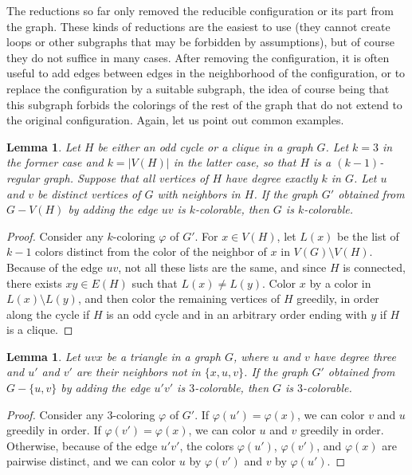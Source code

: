 \documentclass[12pt,twoside,openright,a4paper]{book}
\newtheorem{lemma}[theorem]{Lemma}
\begin{document}
The reductions so far only removed the reducible configuration or its part from the graph.  These kinds of reductions are the easiest
to use (they cannot create loops or other subgraphs that may be forbidden by assumptions), but of course they do not suffice in many cases.
After removing the configuration, it is often useful to add edges between edges in the neighborhood of the configuration, or to replace the
configuration by a suitable subgraph, the idea of course being that this subgraph forbids the colorings of the rest of the graph that do not
extend to the original configuration.  Again, let us point out common examples.
\begin{lemma}\label{lemma-oddclredu}
Let $H$ be either an odd cycle or a clique in a graph $G$.  Let $k=3$ in the former case and $k=|V(H)|$ in the latter case, so that $H$ is a $(k-1)$-regular graph.
Suppose that all vertices of $H$ have degree exactly $k$ in $G$.  Let $u$ and $v$ be distinct vertices of $G$ with neighbors in $H$.
If the graph $G'$ obtained from $G-V(H)$ by adding the edge $uv$ is $k$-colorable, then $G$ is $k$-colorable.
\end{lemma}
\begin{proof}
Consider any $k$-coloring $\varphi$ of $G'$.  For $x\in V(H)$, let $L(x)$ be the list of $k-1$ colors distinct from the color of the neighbor of $x$ in $V(G)\setminus V(H)$.
Because of the edge $uv$, not all these lists are the same, and since $H$ is connected, there exists $xy\in E(H)$ such that $L(x)\neq L(y)$.
Color $x$ by a color in $L(x)\setminus L(y)$, and then color the remaining vertices of $H$ greedily, in order along the cycle if $H$ is an odd cycle
and in an arbitrary order ending with $y$ if $H$ is a clique.
\end{proof}

\begin{lemma}\label{lemma-trian33}
Let $uvx$ be a triangle in a graph $G$, where $u$ and $v$ have degree three and $u'$ and $v'$ are their neighbors not in $\{x,u,v\}$.
If the graph $G'$ obtained from $G-\{u,v\}$ by adding the edge $u'v'$ is $3$-colorable, then $G$ is $3$-colorable.
\end{lemma}
\begin{proof}
Consider any $3$-coloring $\varphi$ of $G'$.  If $\varphi(u')=\varphi(x)$, we can color $v$ and $u$ greedily in order.
If $\varphi(v')=\varphi(x)$, we can color $u$ and $v$ greedily in order.  Otherwise, because of the edge $u'v'$,
the colors $\varphi(u')$, $\varphi(v')$, and $\varphi(x)$ are pairwise distinct, and we can color $u$ by $\varphi(v')$
and $v$ by $\varphi(u')$.
\end{proof}
\end{document}
